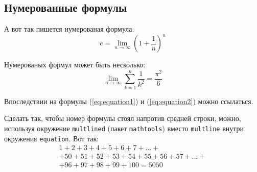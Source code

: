 \subsection{Нумерованные формулы} \label{subsect1_3_3}

А вот так пишется нумерованая формула:
\begin{equation}
  \label{eq:equation1}
  e = \lim_{n \to \infty} \left( 1+\frac{1}{n} \right) ^n
\end{equation}

Нумерованых формул может быть несколько:
\begin{equation}
  \label{eq:equation2}
  \lim_{n \to \infty} \sum_{k=1}^n \frac{1}{k^2} = \frac{\pi^2}{6}
\end{equation}

Впоследствии на формулы (\ref{eq:equation1}) и (\ref{eq:equation2}) можно ссылаться.

Сделать так, чтобы номер формулы стоял напротив средней строки, можно, используя окружение \verb|multlined| (пакет \verb|mathtools|) вместо \verb|multline| внутри окружения \verb|equation|. Вот так:
\begin{equation} %
    \begin{multlined}
        1+ 2+3+4+5+6+7+\dots + \\ 
        + 50+51+52+53+54+55+56+57 + \dots + \\ 
        + 96+97+98+99+100=5050 
    \end{multlined}
\end{equation}
